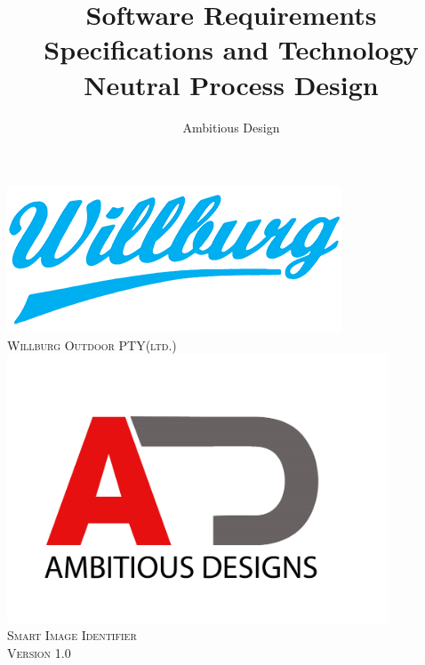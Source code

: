 \documentclass[a4paper,12pt]{report}
\author{Ambitious Design}
\title{ Software Requirements Specifications and Technology Neutral Process Design}
\begin{document}
\setlength{\parskip}{6pt}
\begin{titlepage}

\begin{center}
\includegraphics{../Images/willburg.png}\\
\textsc{\LARGE Willburg Outdoor PTY(ltd.)}\\[1.5cm]

\includegraphics[height=8cm]{../Images/ad.jpg}\\
\textsc{\Large Smart Image Identifier }\\[1.0cm]
\textsc{\Large Version 1.0 }\\[0.5cm]


\end{center}
\end{titlepage}
\end{document}
